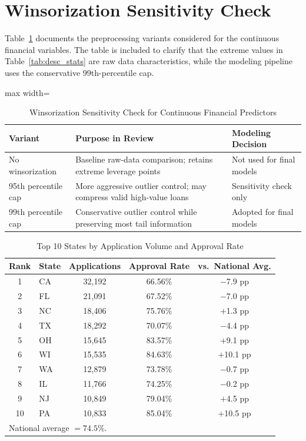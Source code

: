 \documentclass[12pt,letterpaper]{article}
\begin{document}
\section{Winsorization Sensitivity Check}

Table~\ref{tab:winsor_check} documents the preprocessing variants considered for the continuous
financial variables. The table is included to clarify that the extreme values in
Table~\ref{tab:desc_stats} are raw data characteristics, while the modeling pipeline uses the
conservative 99th-percentile cap.

\begin{table}[H]
\centering
\caption{Winsorization Sensitivity Check for Continuous Financial Predictors}
\label{tab:winsor_check}
\begin{adjustbox}{max width=\textwidth}
\begin{tabular}{lll}
\toprule
\textbf{Variant} & \textbf{Purpose in Review} & \textbf{Modeling Decision} \\
\midrule
No winsorization & Baseline raw-data comparison; retains extreme leverage points & Not used for final models \\
95th percentile cap & More aggressive outlier control; may compress valid high-value loans & Sensitivity check only \\
99th percentile cap & Conservative outlier control while preserving most tail information & Adopted for final models \\
\bottomrule
\end{tabular}
\end{adjustbox}
\end{table}

\begin{table}[H]
\centering
\caption{Top 10 States by Application Volume and Approval Rate}
\label{tab:states}
\begin{tabular}{clccc}
\toprule
\textbf{Rank} & \textbf{State} & \textbf{Applications} & \textbf{Approval Rate} &
\textbf{vs.\ National Avg.} \\
\midrule
1  & CA & 32,192 & 66.56\% & $-$7.9 pp \\
2  & FL & 21,091 & 67.52\% & $-$7.0 pp \\
3  & NC & 18,406 & 75.76\% & $+$1.3 pp \\
4  & TX & 18,292 & 70.07\% & $-$4.4 pp \\
5  & OH & 15,645 & 83.57\% & $+$9.1 pp \\
6  & WI & 15,535 & 84.63\% & $+$10.1 pp \\
7  & WA & 12,879 & 73.78\% & $-$0.7 pp \\
8  & IL & 11,766 & 74.25\% & $-$0.2 pp \\
9  & NJ & 10,849 & 79.04\% & $+$4.5 pp \\
10 & PA & 10,833 & 85.04\% & $+$10.5 pp \\
\bottomrule
\multicolumn{5}{l}{\small National average $= 74.5\%$.}
\end{tabular}
\end{table}
\end{document}
